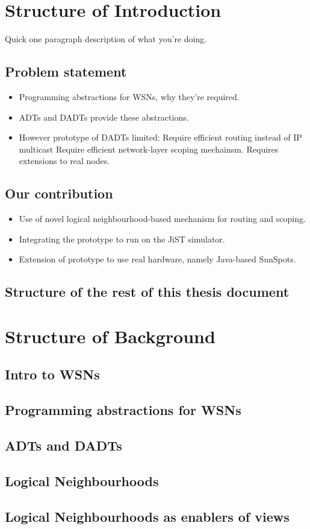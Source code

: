 \documentclass[10pt,a4]{article}
\begin{document}
\section{Structure of Introduction}

Quick one paragraph description of what you're doing.

\subsection{Problem statement}

\begin{itemize}
\item Programming abstractions for WSNs, why they're required.
\item ADTs and DADTs provide these abstractions.
\item However prototype of DADTs limited:
\subitem Require efficient routing instead of IP multicast
\subitem Require efficient network-layer scoping mechainsm.
\subitem Requires extensions to real nodes.

\end{itemize}

\subsection{Our contribution}

\begin{itemize}
\item Use of novel logical neighbourhood-based mechanism for routing and scoping.
\item Integrating the prototype to run on the JiST simulator.
\item Extension of prototype to use real hardware, namely Java-based SunSpots.
\end{itemize}

\subsection{Structure of the rest of this thesis document}

\section{Structure of Background}

\subsection{Intro to WSNs}
\subsection{Programming abstractions for WSNs}
\subsection{ADTs and DADTs}
\subsection{Logical Neighbourhoods}
\subsection{Logical Neighbourhoods as enablers of views}
\end{document}
